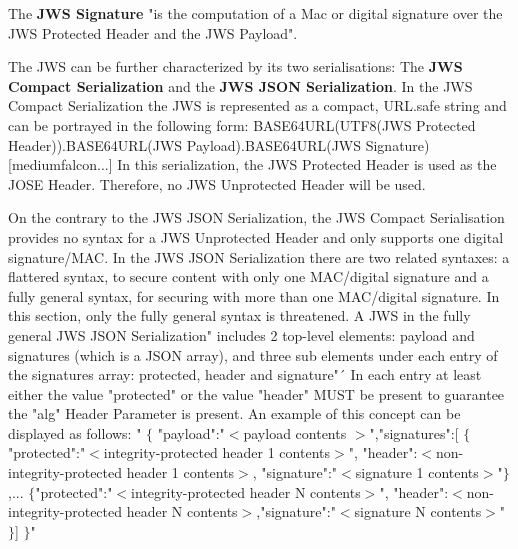 The \textbf{JWS Signature} "is the computation of a Mac or digital signature over the JWS Protected Header and the JWS Payload".\cite{rfc7515}\newline 

The JWS can be further characterized by its two serialisations: The \textbf{JWS Compact Serialization} and the \textbf{JWS JSON Serialization}. 
In the JWS Compact Serialization the JWS is represented as a compact, URL.safe string and can be portrayed in the following form:\newline    
BASE64URL(UTF8(JWS Protected Header)).BASE64URL(JWS Payload).BASE64URL(JWS Signature) [mediumfalcon...]
In this serialization, the JWS Protected Header is used as the JOSE Header. Therefore, no JWS Unprotected Header will be used.

On the contrary to the JWS JSON Serialization, the JWS Compact Serialisation provides no syntax for a JWS Unprotected Header and only supports one digital signature/MAC.
In the JWS JSON Serialization there are two related syntaxes: a flattered syntax, to secure content with only one MAC/digital signature and a fully general syntax, for securing with more than one MAC/digital signature.\cite{rfc7515} In this section, only the fully general syntax is threatened. 
A JWS in the fully general JWS JSON Serialization" includes 2 top-level elements: payload and signatures (which is a JSON array), and three sub elements under each entry of the signatures array: protected, header and signature"´\cite{Dummies}
In each entry at least either the value "protected" or the value "header" MUST be present to guarantee the "alg" Header Parameter is present.\cite{rfc7515}\newline
An example of this concept can be displayed as follows:\newline 
	" $\{$ "payload":"$<$payload contents $>$",\newline    "signatures":[\newline
   $\{$"protected":"$<$integrity-protected header 1 contents$>$",\newline
   "header":$<$non-integrity-protected header 1 contents$>$, \newline
   "signature":"$<$signature 1 contents$>$"$\}$,\newline ...\newline
   $\{$"protected":"$<$integrity-protected header N contents$>$",\newline
   "header":$<$non-integrity-protected header N contents$>$,\newline"signature":"$<$signature N contents$>$"$\}$] \newline    $\}$" \cite{rfc7515}

